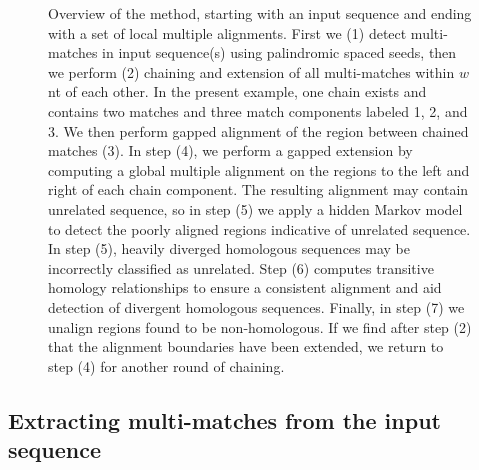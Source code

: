 \documentclass{ws-procs975x65}
\begin{document}
\begin{figure}[p]
\begin{center}
\end{center}
\caption{Overview of the method, starting with an input sequence and ending with a set of local multiple alignments. First we (1) detect multi-matches in input sequence(s) using palindromic spaced seeds, then we perform (2) chaining and extension of all multi-matches within $w$ nt of each other.  In the present example, one chain exists and contains two matches and three match components labeled 1, 2, and 3.  We then perform gapped alignment of the region between chained matches (3).   In step (4), we perform a gapped extension by computing a global multiple alignment on the regions to the left and right of each chain component.  The resulting alignment may contain unrelated sequence, so in step (5) we apply a hidden Markov model to detect the poorly aligned regions indicative of unrelated sequence.  In step (5), heavily diverged homologous sequences may be incorrectly classified as unrelated. Step (6) computes transitive homology relationships to ensure a consistent alignment and aid detection of divergent homologous sequences.  Finally, in step (7) we unalign regions found to be non-homologous.  If we find after step (2) that the alignment boundaries have been extended, we return to step (4) for another round of chaining.}
\label{fig-main}
\end{figure}

\subsection{Extracting multi-matches from the input sequence}
\end{document}
